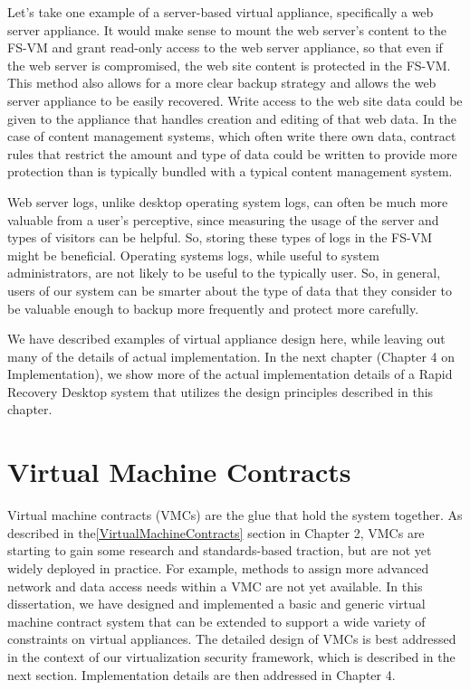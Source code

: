 Let's take one example of a server-based virtual appliance, specifically a web server appliance. It would make sense to mount the web server's content to the FS-VM and grant read-only access to the web server appliance, so that even if the web server is compromised, the web site content is protected in the FS-VM. This method also allows for a more clear backup strategy and allows the web server appliance to be easily recovered. Write access to the web site data could be given to the appliance that handles creation and editing of that web data. In the case of content management systems, which often write there own data, contract rules that restrict the amount and type of data could be written to provide more protection than is typically bundled with a typical content management system.

Web server logs, unlike desktop operating system logs, can often be much more valuable from a user's perceptive, since measuring the usage of the server and types of visitors can be helpful. So, storing these types of logs in the FS-VM might be beneficial. Operating systems logs, while useful to system administrators, are not likely to be useful to the typically user. So, in general, users of our system can be smarter about the type of data that they consider to be valuable enough to backup more frequently and protect more carefully.

We have described examples of virtual appliance design here, while leaving out many of the details of actual implementation. In the next chapter (Chapter 4 on Implementation), we show more of the actual implementation details of a Rapid Recovery Desktop system that utilizes the design principles described in this chapter.

\section{Virtual Machine Contracts}

Virtual machine contracts (VMCs) are the glue that hold the system together. As described in the\ref{VirtualMachineContracts} section in Chapter 2, VMCs are starting to gain some research and standards-based traction\cite{virtual_machine_contract_ICAC09 }, but are not yet widely deployed in practice. For example, methods to assign more advanced network and data access needs within a VMC are not yet available. In this dissertation, we have designed and implemented a basic and generic virtual machine contract system that can be extended to support a wide variety of constraints on virtual appliances. The detailed design of VMCs is best addressed in the context of our virtualization security framework, which is described in the next section. Implementation details are then addressed in Chapter 4.

